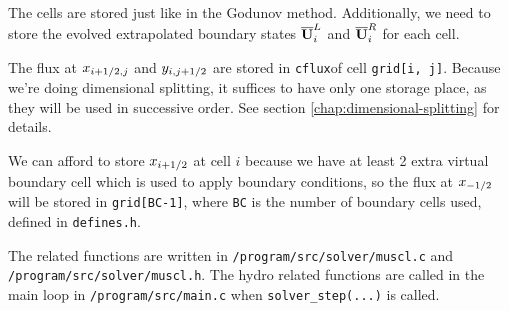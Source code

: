 The cells are stored just like in the Godunov method.
Additionally, we need to store the evolved extrapolated boundary states $\overline{\mathbf{U}}_i^L$ and $\overline{\mathbf{U}}_i^R$ for each cell.


The flux at $x_{i+1/2, j}$ and $y_{i, j+1/2}$ are stored in \texttt{cflux}of cell \verb|grid[i, j]|.
Because we're doing dimensional splitting, it suffices to have only one storage place, as they will be used in successive order.
See section \ref{chap:dimensional-splitting} for details.

We can afford to store $x_{i+1/2}$ at cell $i$ because we have at least 2 extra virtual boundary cell which is used to apply boundary conditions, so the flux at $x_{-1/2}$ will be stored in \verb|grid[BC-1]|, where \texttt{BC} is the number of boundary cells used, defined in \texttt{defines.h}.
 



The related functions are written in \texttt{/program/src/solver/muscl.c} and \texttt{/program/src/solver/muscl.h}.
The hydro related functions are called in the main loop in \texttt{/program/src/main.c} when \verb|solver_step(...)| is called.

